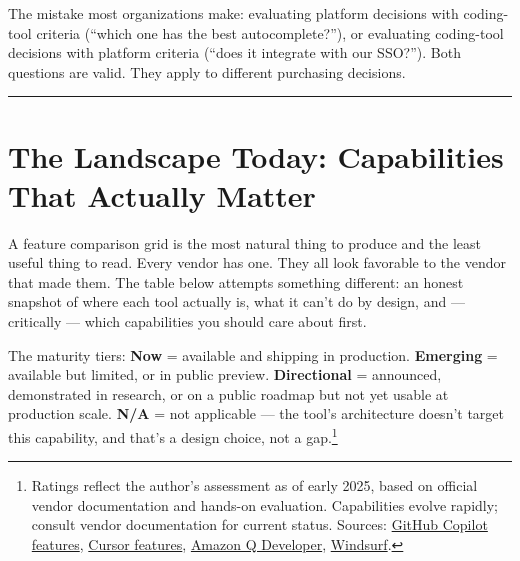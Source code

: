 \documentclass[
  a4paper,
  DIV=11,
  numbers=noendperiod]{scrreprt}
\begin{document}
The mistake most organizations make: evaluating platform decisions with
coding-tool criteria (``which one has the best autocomplete?''), or
evaluating coding-tool decisions with platform criteria (``does it
integrate with our SSO?''). Both questions are valid. They apply to
different purchasing decisions.

\begin{center}\rule{0.5\linewidth}{0.5pt}\end{center}

\section{The Landscape Today: Capabilities That Actually
Matter}\label{the-landscape-today-capabilities-that-actually-matter}

A feature comparison grid is the most natural thing to produce and the
least useful thing to read. Every vendor has one. They all look
favorable to the vendor that made them. The table below attempts
something different: an honest snapshot of where each tool actually is,
what it can't do by design, and --- critically --- which capabilities
you should care about first.

The maturity tiers: \textbf{Now} = available and shipping in production.
\textbf{Emerging} = available but limited, or in public preview.
\textbf{Directional} = announced, demonstrated in research, or on a
public roadmap but not yet usable at production scale. \textbf{N/A} =
not applicable --- the tool's architecture doesn't target this
capability, and that's a design choice, not a gap.\footnote{Ratings
  reflect the author's assessment as of early 2025, based on official
  vendor documentation and hands-on evaluation. Capabilities evolve
  rapidly; consult vendor documentation for current status. Sources:
  \href{https://docs.github.com/en/copilot/about-github-copilot/github-copilot-features}{GitHub
  Copilot features}, \href{https://www.cursor.com/features}{Cursor
  features}, \href{https://aws.amazon.com/q/developer/}{Amazon Q
  Developer}, \href{https://codeium.com/windsurf}{Windsurf}.}
\end{document}
